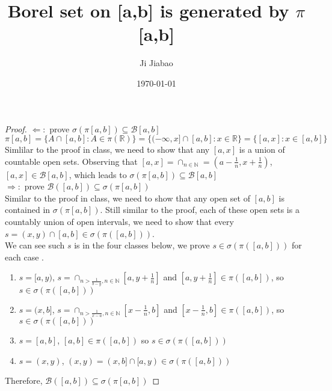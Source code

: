 \documentclass{article}
\title{Borel set on [a,b] is generated by $\pi$[a,b]}
\author{Ji Jiabao}
\date{\today}
\begin{document}
\maketitle

\begin{proof}
    \hspace*{1em} \newline
    \hspace*{1em} $\Leftarrow:$ prove $\sigma(\pi[a,b]) \subseteq \mathcal{B}[a,b]$\\
    \hspace*{1em} $$\pi[a,b] = \{ A \cap [a,b]: A \in \pi(\mathbb{R}) \} = \{ (-\infty , x] \cap [a,b] : x \in \mathbb{R} \} = \{ [a, x]: x \in [a,b] \}$$
    \hspace*{1em} Simlilar to the proof in class, we need to show that any $[a,x]$ is a union of countable open sets.
    Observing that $[a, x] = \cap_{n \in \mathbb{N}} = (a - \frac{1}{n}, x + \frac{1}{n})$, $[a, x] \in \mathcal{B}[a,b]$, which leads to $\sigma(\pi [a,b]) \subseteq \mathcal{B}[a,b]$\\


    $\Rightarrow:$ prove $\mathcal{B}([a,b]) \subseteq \sigma(\pi[a,b])$ \\
    \hspace*{1em} Similar to the proof in class, we need to show that any open set of $[a,b]$ is contained in 
    $\sigma(\pi[a,b])$. Still similar to the proof, each of these open sets is a countably union of open intervals,
    we need to show that every $s = (x, y) \cap [a,b] \in \sigma(\pi([a,b]))$.\\
    \hspace*{1em} We can see such $s$ is in the four classes below, we prove $s \in \sigma(\pi([a,b]))$ for each case .
    \begin{enumerate}   
        \item $s = [a, y)$, $s = \cap_{n > \frac{1}{b - y}, n \in \mathbb{N}}[a, y + \frac{1}{n}]$ and $[a, y + \frac{1}{n}] \in \pi([a,b])$, so $s \in \sigma(\pi([a,b]))$
        \item $s = (x, b]$, $s = \cap_{n > \frac{1}{x - a}, n \in \mathbb{N}}[x - \frac{1}{n}, b]$ and $[x - \frac{1}{n}, b] \in \pi([a,b])$, so $s \in \sigma(\pi([a,b]))$
        \item $s = [a, b]$, $[a, b] \in \pi([a,b])$ so $s \in \sigma(\pi([a,b]))$
        \item $s = (x, y)$, $(x, y) = (x, b] \cap [a, y) \in \sigma(\pi([a,b]))$
    \end{enumerate}
    \hspace*{1em}Therefore, $\mathcal{B}([a,b]) \subseteq \sigma(\pi[a,b])$
\end{proof}
\end{document}

